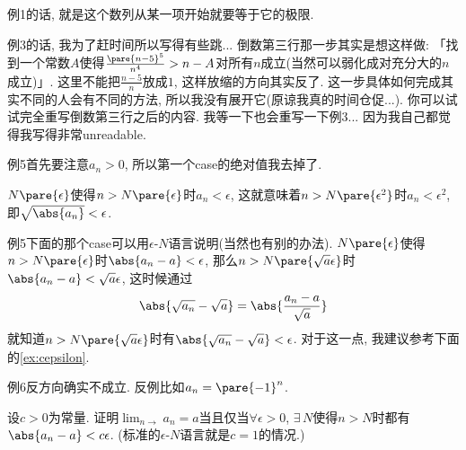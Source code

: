 \documentclass{ctexart}
\begin{document}
\begin{cenum}
    \item 例1的话, 就是这个数列从某一项开始就要等于它的极限.
    \item 例3的话, 我为了赶时间所以写得有些跳... 倒数第三行那一步其实是想这样做: 「找到一个常数$A$使得$\frac{\pare{n-5}^5}{n^4} > n-A$对所有$n$成立(当然可以弱化成对充分大的$n$成立)」. 这里不能把$\frac{n-5}{n}$放成$1$, 这样放缩的方向其实反了. 这一步具体如何完成其实不同的人会有不同的方法, 所以我没有展开它(原谅我真的时间仓促...). 你可以试试完全重写倒数第三行之后的内容. 我等一下也会重写一下例3... 因为我自己都觉得我写得非常unreadable.
    \item 例5首先要注意$a_n>0$, 所以第一个case的绝对值我去掉了.
    \begin{cenum}
        \item $N\pare{\epsilon}$使得$n>N\pare{\epsilon}$时${a_n}<\epsilon$, 这就意味着$n>N\pare{\epsilon^2}$时${a_n}<\epsilon^2$, 即$\sqrt{\abs{a_n}} < \epsilon$.
        \item 例5下面的那个case可以用$\epsilon$-$N$语言说明(当然也有别的办法). $N\pare{\epsilon}$使得$n>N\pare{\epsilon}$时$\abs{a_n-a}<\epsilon$, 那么$n>N\pare{\sqrt{a}\epsilon}$时$\abs{a_n-a}<\sqrt{a}\epsilon$, 这时候通过
        \[ \abs{\sqrt{a_n} - \sqrt{a}} = \abs{\frac{a_n-a}{\sqrt{a}}} \]
        就知道$n>N\pare{\sqrt{a}\epsilon}$时有$\abs{\sqrt{a_n} - \sqrt{a}} < \epsilon$. 对于这一点, 我建议参考下面的\cref{ex:cepsilon}.
    \end{cenum}
    \item 例6反方向确实不成立. 反例比如$a_n = \pare{-1}^n$.
\end{cenum}
\begin{ex}
    \label{ex:cepsilon}
    设$c>0$为常量. 证明$\displaystyle \lim_{n\rightarrow} a_n = a$当且仅当$\forall \epsilon > 0$, $\exists\, N$使得$n>N$时都有$\abs{a_n - a} < c\epsilon$. (标准的$\epsilon$-$N$语言就是$c=1$的情况.)
\end{ex}
\end{document}
